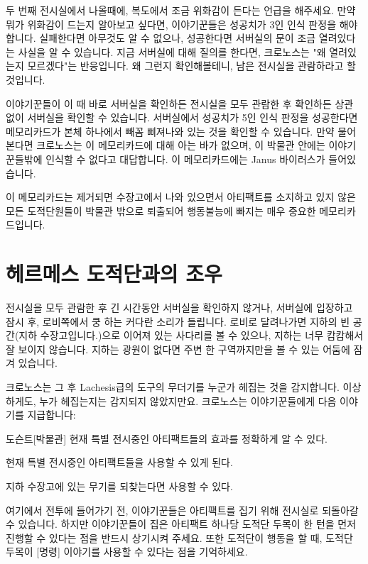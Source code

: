 \documentclass{report}
\begin{document}
	두 번째 전시실에서 나올때에, 복도에서 조금 위화감이 든다는 언급을 해주세요. 만약 뭐가 위화감이 드는지 알아보고 싶다면, 이야기꾼들은 성공치가 3인 인식 판정을 해야합니다. 실패한다면 아무것도 알 수 없으나, 성공한다면 서버실의 문이 조금 열려있다는 사실을 알 수 있습니다. 지금 서버실에 대해 질의를 한다면, 크로노스는 "왜 열려있는지 모르겠다"는 반응입니다. 왜 그런지 확인해볼테니, 남은 전시실을 관람하라고 할 것입니다.
	
	이야기꾼들이 이 때 바로 서버실을 확인하든 전시실을 모두 관람한 후 확인하든 상관 없이 서버실을 확인할 수 있습니다. 서버실에서 성공치가 5인 인식 판정을 성공한다면 메모리카드가 본체 하나에서 빼꼼 삐져나와 있는 것을 확인할 수 있습니다. 만약 물어본다면 크로노스는 이 메모리카드에 대해 아는 바가 없으며, 이 박물관 안에는 이야기꾼들밖에 인식할 수 없다고 대답합니다. 이 메모리카드에는 Janus 바이러스가 들어있습니다.
	
	이 메모리카드는 제거되면 수장고에서 나와 있으면서 아티팩트를 소지하고 있지 않은 모든 도적단원들이 박물관 밖으로 퇴출되어 행동불능에 빠지는 매우 중요한 메모리카드입니다.
	
	\section*{헤르메스 도적단과의 조우}
	전시실을 모두 관람한 후 긴 시간동안 서버실을 확인하지 않거나, 서버실에 입장하고 잠시 후, 로비쪽에서 쿵 하는 커다란 소리가 들립니다. 로비로 달려나가면 지하의 빈 공간(지하 수장고입니다.)으로 이어져 있는 사다리를 볼 수 있으나, 지하는 너무 캄캄해서 잘 보이지 않습니다. 지하는 광원이 없다면 주변 한 구역까지만을 볼 수 있는 어둠에 잠겨 있습니다.
	
	크로노스는 그 후 Lachesis급의 도구의 무더기를 누군가 헤집는 것을 감지합니다. 이상하게도, 누가 헤집는지는 감지되지 않았지만요. 크로노스는 이야기꾼들에게 다음 이야기를 지급합니다:
	\begin{story}{도슨트}{[박물관]}
		현재 특별 전시중인 아티팩트들의 효과를 정확하게 알 수 있다.
		
		현재 특별 전시중인 아티팩트들을 사용할 수 있게 된다.
		
		지하 수장고에 있는 무기를 되찾는다면 사용할 수 있다.
	\end{story}
	여기에서 전투에 들어가기 전, 이야기꾼들은 아티팩트를 집기 위해 전시실로 되돌아갈 수 있습니다. 하지만 이야기꾼들이 집은 아티팩트 하나당 도적단 두목이 한 턴을 먼저 진행할 수 있다는 점을 반드시 상기시켜 주세요. 또한 도적단이 행동을 할 때, 도적단 두목이 [명령] 이야기를 사용할 수 있다는 점을 기억하세요.
	
\end{document}
